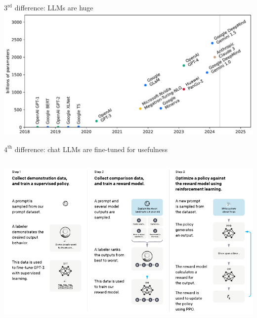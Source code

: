 \documentclass[aspectratio=169]{beamer}
\begin{document}
\begin{frame}{$3^{\mbox{rd}}$ difference: LLMs are huge}
\vspace{0.5 cm}
\includegraphics[width=\linewidth]{llm-number-of-parameters.pdf}
\end{frame}

\begin{frame}{$4^{\mbox{th}}$ difference: chat LLMs are fine-tuned for usefulness}
\vspace{0.5 cm}
\begin{columns}
\includegraphics[width=\linewidth]{fine-tuning-for-chat.pdf}
\end{columns}
\end{frame}
\end{document}
